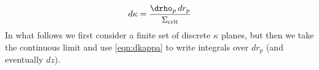 \begin{equation}
\label{eqn:dkappa}
  d\kappa = \frac{\drho_p\,dr_p}{\Sigma_{\rm crit}}
 \end{equation}
In what follows we first consider a finite set of discrete $\kappa$ planes, but then we take the continuous limit and use \ref{eqn:dkappa} to write integrals over $dr_p$ (and eventually $dz$).
  
  